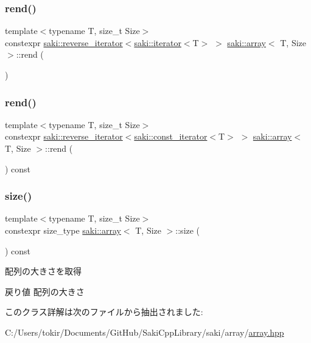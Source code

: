 \subsubsection{\texorpdfstring{rend()}{rend()}\hspace{0.1cm}{\footnotesize\ttfamily [1/2]}}
{\footnotesize\ttfamily template$<$typename T, size\+\_\+t Size$>$ \\
constexpr \mbox{\hyperlink{classsaki_1_1reverse__iterator}{saki\+::reverse\+\_\+iterator}}$<$\mbox{\hyperlink{classsaki_1_1iterator}{saki\+::iterator}}$<$T$>$ $>$ \mbox{\hyperlink{classsaki_1_1array}{saki\+::array}}$<$ T, Size $>$\+::rend (\begin{DoxyParamCaption}{ }\end{DoxyParamCaption})\hspace{0.3cm}{\ttfamily [inline]}}

\mbox{\label{classsaki_1_1array_a6816a951bfc1e6b13aec4fd54ec0bf63}} 
\subsubsection{\texorpdfstring{rend()}{rend()}\hspace{0.1cm}{\footnotesize\ttfamily [2/2]}}
{\footnotesize\ttfamily template$<$typename T, size\+\_\+t Size$>$ \\
constexpr \mbox{\hyperlink{classsaki_1_1reverse__iterator}{saki\+::reverse\+\_\+iterator}}$<$\mbox{\hyperlink{classsaki_1_1const__iterator}{saki\+::const\+\_\+iterator}}$<$T$>$ $>$ \mbox{\hyperlink{classsaki_1_1array}{saki\+::array}}$<$ T, Size $>$\+::rend (\begin{DoxyParamCaption}{ }\end{DoxyParamCaption}) const\hspace{0.3cm}{\ttfamily [inline]}}

\mbox{\label{classsaki_1_1array_ae9f4ac2980f19263ef29ac1dca694fed}} 
\subsubsection{\texorpdfstring{size()}{size()}}
{\footnotesize\ttfamily template$<$typename T, size\+\_\+t Size$>$ \\
constexpr size\+\_\+type \mbox{\hyperlink{classsaki_1_1array}{saki\+::array}}$<$ T, Size $>$\+::size (\begin{DoxyParamCaption}{ }\end{DoxyParamCaption}) const\hspace{0.3cm}{\ttfamily [inline]}}



配列の大きさを取得 

\begin{DoxyReturn}{戻り値}
配列の大きさ 
\end{DoxyReturn}


このクラス詳解は次のファイルから抽出されました\+:\begin{DoxyCompactItemize}
\item 
C\+:/\+Users/tokir/\+Documents/\+Git\+Hub/\+Saki\+Cpp\+Library/saki/array/\mbox{\hyperlink{array_2array_8hpp}{array.\+hpp}}\end{DoxyCompactItemize}
